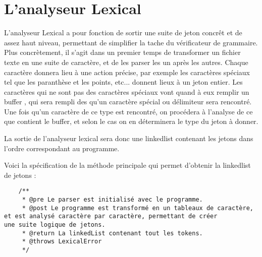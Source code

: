\section{L'analyseur Lexical}

L'analyseur Lexical a pour fonction de sortir une suite de jeton concrêt et de assez haut niveau, permettant de simplifier la tache du vérificateur de grammaire. Plus concrètement, il s'agit dans un premier temps de transformer un fichier texte en une suite de caractère, et de les parser les un après les autres. Chaque caractère donnera lieu à une action précise, par exemple les caractères spéciaux tel que les paranthèse et les points, etc... donnent lieux à un jeton entier.
Les caractères qui ne sont pas des caractères spéciaux vont quand à eux remplir un buffer , qui sera rempli des qu'un caractère spécial ou délimiteur sera rencontré. Une fois qu'un caractère de ce type est rencontré, on procédera à l'analyse de ce que contient le buffer, et selon le cas on en déterminera le type du jeton à donner.

La sortie de l'analyseur lexical sera donc une linkedlist contenant les jetons dans l'ordre correspondant au programme.

Voici la spécification de la méthode principale qui permet d'obtenir la linkedlist de jetons :

\begin{verbatim}
	/**
	 * @pre Le parser est initialisé avec le programme.
	 * @post Le programme est transformé en un tableaux de caractère, 
et est analysé caractère par caractère, permettant de créer 
une suite logique de jetons.
	 * @return La linkedList contenant tout les tokens.
	 * @throws LexicalError
	 */
\end{verbatim}
